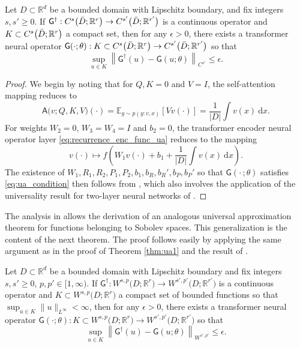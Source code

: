 \documentclass[twoside]{article}
\newcommand{\1}{\mathbbm{1}}
\newcommand{\R}{\mathbbm{R}}
\newcommand{\sA}{\mathsf{A}}
\newcommand{\sG}{\mathsf{G}}
\providecommand{\mathbbm}{\mathbb} %
\begin{document}
 

\begin{theorem}
\label{thm:ua1}
Let $D\subset \R^d$ be a bounded domain with Lipschitz boundary, and fix integers $s,s'\geq 0$. If $\sG^\dagger:C^s\bigl(\Bar{D};\R^r\bigr) \to C^{s'}\bigl(\Bar{D};\R^{r'}\bigr)$
is a continuous operator and $K\subset C^s\bigl(\Bar{D};\R^r\bigr)$ a compact set, then for any $\epsilon>0$, there exists a transformer neural operator 
$\sG(\cdot;\theta):K\subset C^s\bigl(\Bar{D};\R^r\bigr) \to C^{s'}\bigl(\Bar{D};\R^{r'}\bigr)$ so that
\begin{equation}
\label{eq:ua_condition}
\sup_{u\in K} \left\|\sG^\dagger(u) - \sG(u;\theta)   \right\|_{C^{s'}} \leq \epsilon.
\end{equation}
\end{theorem}
\begin{proof}
We begin by noting that for $Q,K=0$ and $V = I$, the self-attention mapping reduces to 
\begin{equation}
\sA\bigl(v;Q,K,V \bigr)(\cdot) = \mathbb{E}_{y\sim p(y:v,x)}[V v(\cdot)] = \frac{1}{|D|}\int v(x)~\mathrm{d} x.
\end{equation}
For weights $W_2=0$, $W_3=W_4=I$ and $b_2 = 0$, the transformer encoder neural operator layer \eqref{eq:recurrence_enc_func_ua} reduces to the mapping 
\begin{equation}
\label{eq:nonlocal_NO}
    v(\cdot) \mapsto f\left(W_1v(\cdot) + b_1 + \frac{1}{|D|}\int v(x)~\mathrm{d} x \right).
\end{equation}
The existence of $W_1,R_1,R_2,P_1,P_2,b_1,b_R,b_R',b_P,b_P'$ so that $\sG(\cdot\,;\theta)$ satisfies \eqref{eq:ua_condition} then follows from \citet[Theorem 2.1]{lanthaler2023nonlocal}, which also involves the application of the universality result for two-layer neural networks of \citet[Theorem 4.1]{Pinkus_1999}.
\end{proof}

The analysis in \citet{lanthaler2023nonlocal} allows the derivation of an analogous universal approximation theorem for functions belonging to Sobolev spaces. This generalization is the content of
the next theorem. The proof follows easily by applying the same argument as in the proof of Theorem \ref{thm:ua1} and the result of \citet[Theorem 2.2]{lanthaler2023nonlocal}.
\begin{theorem}
\label{thm:ua2}
Let $D\subset \R^d$ be a bounded domain with Lipschitz boundary and fix integers $s,s'\geq 0$, $p,p'\in[1,\infty)$. If $\sG^\dagger:W^{s,p}\bigl(D;\R^r\bigr) \to W^{s',p'}\bigl(D;\R^{r'}\bigr)$
is a continuous operator and $K\subset W^{s,p}\bigl(D;\R^r\bigr)$ a compact set of bounded functions so that $\sup_{u\in K}\|u\|_{L^\infty}<\infty$, then for any $\epsilon>0$, there exists a transformer neural operator 
$\sG(\cdot;\theta):K\subset W^{s,p}\bigl(D;\R^r\bigr) \to W^{s',p'}\bigl(D;\R^{r'}\bigr)$ so that
\begin{equation}
\sup_{u\in K} \left\|\sG^\dagger(u) - \sG(u;\theta)   \right\|_{W^{s',p'}} \leq \epsilon.
\end{equation}
\end{theorem}
\end{document}
